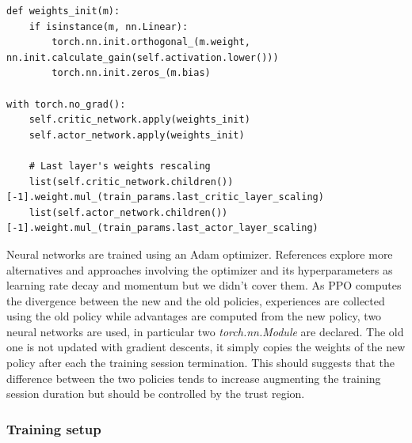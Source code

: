 \documentclass[11pt, a4paper, hidelinks]{report}
\begin{document}
\begin{lstlisting}[label={lst:psppo-net-init}]
def weights_init(m):
	if isinstance(m, nn.Linear):
		torch.nn.init.orthogonal_(m.weight, nn.init.calculate_gain(self.activation.lower()))
		torch.nn.init.zeros_(m.bias)

with torch.no_grad():
	self.critic_network.apply(weights_init)
	self.actor_network.apply(weights_init)

	# Last layer's weights rescaling
	list(self.critic_network.children())[-1].weight.mul_(train_params.last_critic_layer_scaling)
	list(self.actor_network.children())[-1].weight.mul_(train_params.last_actor_layer_scaling)
\end{lstlisting}

Neural networks are trained using an Adam optimizer.
References explore more alternatives and approaches involving the optimizer and its hyperparameters as learning rate decay and momentum but we didn't cover them.
As PPO computes the divergence between the new and the old policies, experiences are collected using the old policy while advantages are computed from the new policy, two neural networks are used, in particular two \textit{torch.nn.Module} are declared.
The old one is not updated with gradient descents, it simply copies the weights of the new policy after each the training session termination.
This should suggests that the difference between the two policies tends to increase augmenting the training session duration but should be controlled by the trust region.

\subsubsection{Training setup}\label{subsubsec:training-setup}
\end{document}
